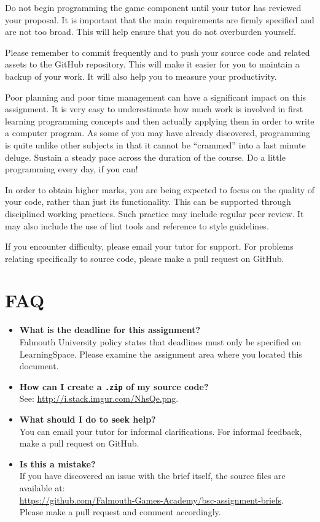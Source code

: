 \documentclass{../fal_assignment}
\begin{document}
Do not begin programming the game component until your tutor has reviewed your proposal. It is important that the main requirements are firmly specified and are not too broad. This will help ensure that you do not overburden yourself. 

Please remember to commit frequently and to push your source code and related assets to the GitHub repository. This will make it easier for you to maintain a backup of your work. It will also help you to measure your productivity.

Poor planning and poor time management can have a significant impact on this assignment. It is very easy to underestimate how much work is involved in first learning programming concepts and then actually applying them in order to write a computer program. As some of you may have already discovered, programming is quite unlike other subjects in that it cannot be ``crammed'' into a last minute deluge. Sustain a steady pace across the duration of the course. Do a little programming every day, if you can!

In order to obtain higher marks, you are being expected to focus on the quality of your code, rather than just its functionality. This can be supported through disciplined working practices. Such practice may include regular peer review. It may also include the use of lint tools and reference to style guidelines.

If you encounter difficulty, please email your tutor for support. For problems relating specifically to source code, please make a pull request on GitHub.

\section*{FAQ}

\begin{itemize}
	\item 	\textbf{What is the deadline for this assignment?} \\ 
    		Falmouth University policy states that deadlines must only be specified on LearningSpace. Please examine the assignment area where you located this document.
    		
    	\item 	\textbf{How can I create a \texttt{.zip} of my source code?} \\ 
    		See: \url{http://i.stack.imgur.com/NhsQe.png}. 
    		
	\item 	\textbf{What should I do to seek help?} \\ 
    		You can email your tutor for informal clarifications. For informal feedback, make a pull request on GitHub. 
    		
    	\item 	\textbf{Is this a mistake?} \\ 	
    		If you have discovered an issue with the brief itself, the source files are available at: \\
    		\url{https://github.com/Falmouth-Games-Academy/bsc-assignment-briefs}.\\
    		 Please make a pull request and comment accordingly.
\end{itemize}
\end{document}
